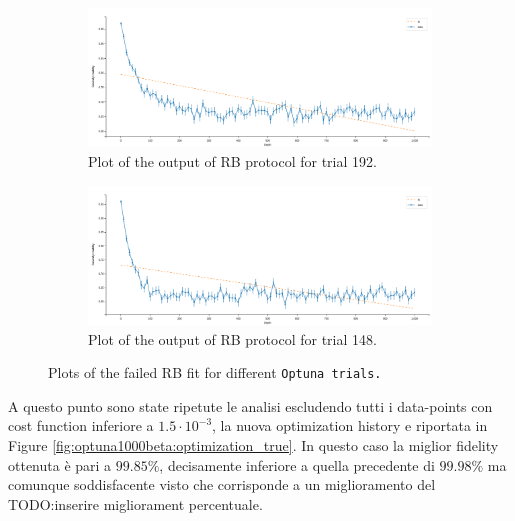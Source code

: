 \begin{figure}[h!]
    \begin{subfigure}[t]{0.45\textwidth}
        \includegraphics[width=\textwidth]{figures/png/RB_optimization/Optuna/1000beta/failed3.png}
        \caption{Plot of the output of RB protocol for trial 192.}
        \label{fig:optuna1000beta:failed3}
    \end{subfigure}
    \hfill
    \begin{subfigure}[t]{0.45\textwidth}
        \includegraphics[width=\textwidth]{figures/png/RB_optimization/Optuna/1000beta/failed4.png}
        \caption{Plot of the output of RB protocol for trial 148.}
        \label{fig:optuna1000beta:failed4}
    \end{subfigure}

    \caption{Plots of the failed RB fit for different \tt{Optuna} trials.}
    \label{fig:RBfailed}
\end{figure}

A questo punto sono state ripetute le analisi escludendo tutti i data-points con cost function inferiore a $1.5\cdot10^{-3}$, la nuova optimization history e riportata in Figure \ref{fig:optuna1000beta:optimization_true}.
In questo caso la miglior fidelity ottenuta è pari a $99.85\%$, decisamente inferiore a quella precedente di $99.98\%$ ma comunque soddisfacente visto che corrisponde a un miglioramento del TODO:inserire migliorament percentuale. 

